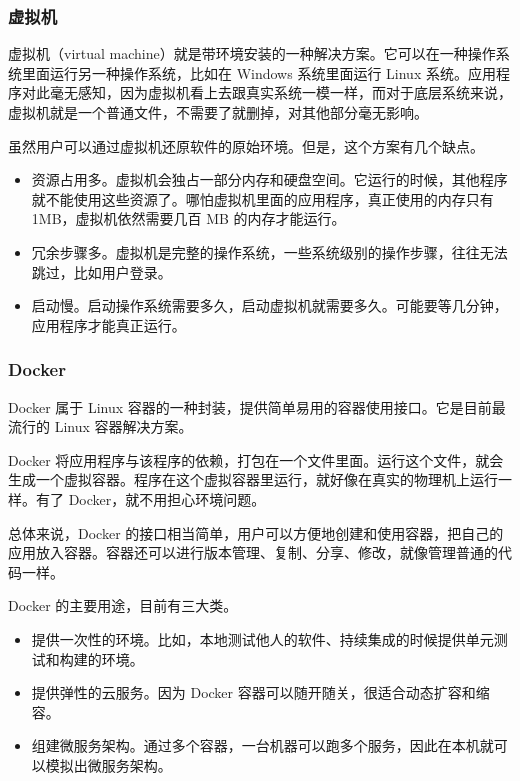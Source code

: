 \subsubsection{虚拟机}

虚拟机（virtual machine）就是带环境安装的一种解决方案。它可以在一种操作系统里面运行另一种操作系统，比如在 Windows 系统里面运行 Linux 系统。应用程序对此毫无感知，因为虚拟机看上去跟真实系统一模一样，而对于底层系统来说，虚拟机就是一个普通文件，不需要了就删掉，对其他部分毫无影响。

虽然用户可以通过虚拟机还原软件的原始环境。但是，这个方案有几个缺点。

\begin{itemize}
  \item 资源占用多。虚拟机会独占一部分内存和硬盘空间。它运行的时候，其他程序就不能使用这些资源了。哪怕虚拟机里面的应用程序，真正使用的内存只有 1MB，虚拟机依然需要几百 MB 的内存才能运行。
  \item 冗余步骤多。虚拟机是完整的操作系统，一些系统级别的操作步骤，往往无法跳过，比如用户登录。
  \item 启动慢。启动操作系统需要多久，启动虚拟机就需要多久。可能要等几分钟，应用程序才能真正运行。
\end{itemize}

\subsubsection{Docker}

Docker 属于 Linux 容器的一种封装，提供简单易用的容器使用接口。它是目前最流行的 Linux 容器解决方案。

Docker 将应用程序与该程序的依赖，打包在一个文件里面。运行这个文件，就会生成一个虚拟容器。程序在这个虚拟容器里运行，就好像在真实的物理机上运行一样。有了 Docker，就不用担心环境问题。

总体来说，Docker 的接口相当简单，用户可以方便地创建和使用容器，把自己的应用放入容器。容器还可以进行版本管理、复制、分享、修改，就像管理普通的代码一样。

Docker 的主要用途，目前有三大类。
\begin{itemize}
\item 提供一次性的环境。比如，本地测试他人的软件、持续集成的时候提供单元测试和构建的环境。
\item 提供弹性的云服务。因为 Docker 容器可以随开随关，很适合动态扩容和缩容。
\item 组建微服务架构。通过多个容器，一台机器可以跑多个服务，因此在本机就可以模拟出微服务架构。
\end{itemize}
